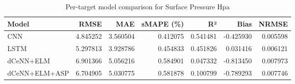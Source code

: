\begin{table}
\caption{Per-target model comparison for Surface Pressure Hpa}
\begin{tabular}{lrrrrrr}
\toprule
Model & RMSE & MAE & sMAPE (\%) & R² & Bias & NRMSE \\
\midrule
CNN & 4.845252 & 3.560504 & 0.412075 & 0.541481 & -0.425930 & 0.005598 \\
LSTM & 5.297813 & 3.928786 & 0.454833 & 0.451826 & 0.031416 & 0.006121 \\
dCeNN+ELM & 6.901366 & 5.056216 & 0.584901 & 0.047332 & -0.813450 & 0.007973 \\
dCeNN+ELM+ASP & 6.704905 & 5.030775 & 0.581878 & 0.100799 & -0.789293 & 0.007746 \\
\bottomrule
\end{tabular}
\end{table}
